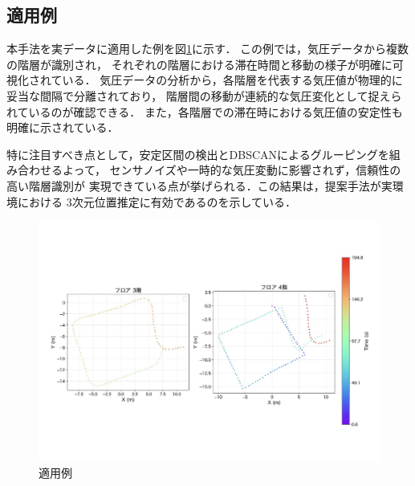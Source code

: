 \subsection{適用例}
本手法を実データに適用した例を図\ref{fig:move_between_floor}に示す．
この例では，気圧データから複数の階層が識別され，
それぞれの階層における滞在時間と移動の様子が明確に可視化されている．
気圧データの分析から，各階層を代表する気圧値が物理的に妥当な間隔で分離されており，
階層間の移動が連続的な気圧変化として捉えられているのが確認できる．
また，各階層での滞在時における気圧値の安定性も明確に示されている．

特に注目すべき点として，安定区間の検出とDBSCANによるグルーピングを組み合わせるよって，
センサノイズや一時的な気圧変動に影響されず，信頼性の高い階層識別が
実現できている点が挙げられる．この結果は，提案手法が実環境における
3次元位置推定に有効であるのを示している．


\begin{figure}[h]
	\centering
	\includegraphics[width=\linewidth]{../image/move_between_floor.pdf}
	\caption{適用例}    \label{fig:move_between_floor}
\end{figure}
